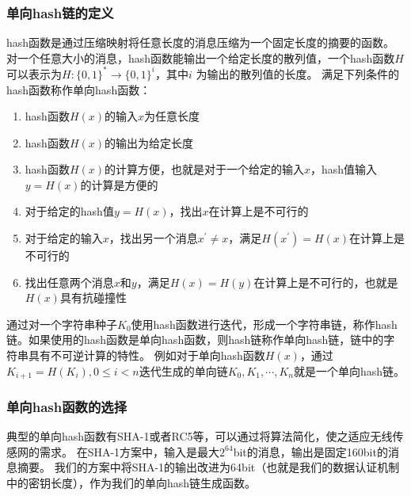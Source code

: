 \subsubsection{单向hash链的定义}
hash函数是通过压缩映射将任意长度的消息压缩为一个固定长度的摘要的函数。
对一个任意大小的消息，hash函数能输出一个给定长度的散列值，一个hash函数$H$可以表示为$H:\{0,1\}^*\rightarrow\{0,1\}^i$，其中$i$ 为输出的散列值的长度。
满足下列条件的hash函数称作单向hash函数：
\begin{enumerate}\setlength{\itemsep}{-\itemsep}
  \item hash函数$H(x)$的输入$x$为任意长度
  \item hash函数$H(x)$的输出为给定长度
  \item hash函数$H(x)$的计算方便，也就是对于一个给定的输入$x$，hash值输入$y=H(x)$的计算是方便的
  \item 对于给定的hash值$y=H(x)$，找出$x$在计算上是不可行的
  \item 对于给定的输入$x$，找出另一个消息$x^{'}\neq x$，满足$H(x^{'})=H(x)$在计算上是不可行的
  \item 找出任意两个消息$x$和$y$，满足$H(x)=H(y)$在计算上是不可行的，也就是$H(x)$具有抗碰撞性
\end{enumerate}



通过对一个字符串种子$K_0$使用hash函数进行迭代，形成一个字符串链，称作hash链。如果使用的hash函数是单向hash函数，则hash链称作单向hash链，链中的字符串具有不可逆计算的特性。
例如对于单向hash函数$H(x)$，通过$K_{i+1}=H(K_i),0\leq i < n$迭代生成的单向链$K_0,K_1,\cdots,K_n$就是一个单向hash链。

\subsubsection{单向hash函数的选择}
典型的单向hash函数有SHA-1或者RC5等，可以通过将算法简化，使之适应无线传感网的需求。
在SHA-1方案中，输入是最大$2^{64}$bit的消息，输出是固定160bit的消息摘要。
我们的方案中将SHA-1的输出改进为64bit（也就是我们的数据认证机制中的密钥长度），作为我们的单向hash链生成函数。

